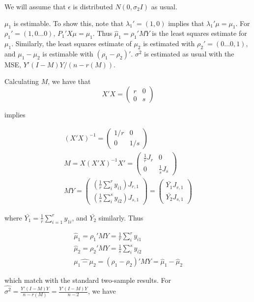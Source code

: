 \documentclass{article}
\begin{document}
We will assume that $\epsilon$ is distributed $N(0, \sigma_2I)$ as usual.

$\mu_1$ is estimable. To show this, note that $\lambda_1' = (1, 0)$ implies that $\lambda_1' \mu = \mu_1$. For $\rho_1' = (1, 0 \dots 0)$, $P_1'X\mu = \mu_1$. Thus $\hat{\mu}_1 = \rho_1'MY$ is the least squares estimate for $\mu_1$. Similarly, the least squares estimate of $\mu_2$ is estimated with $\rho_2' = (0 \dots 0, 1)$, and $\mu_1 - \mu_2$ is estimable with $(\rho_1 - \rho_2)'$. $\sigma^2$ is estimated as usual with the MSE, $Y'(I-M)Y/(n-r(M))$.

Calculating $M$, we have that
\[
X'X = \begin{pmatrix}
r & 0 \\
0 & s \end{pmatrix}
\]

implies

\begin{gather*}
(X'X)^{-1} = \begin{pmatrix}
1/r & 0 \\
0 & 1/s \end{pmatrix} \\
M = X(X'X)^{-1}X' = \begin{pmatrix}
\frac{1}{r} J_{r} & 0 \\
0 & \frac{1}{s} J_{s}
\end{pmatrix} \\
MY = \begin{pmatrix}
\left(\frac{1}{r}\sum_i^r y_{i1}\right)J_{r,1} \\
\left(\frac{1}{s}\sum_i^s y_{i2}\right)J_{s,1}
\end{pmatrix} = 
\begin{pmatrix}
\bar{Y_1}J_{r,1} \\
\bar{Y_2}J_{s,1}
\end{pmatrix}
\end{gather*}

where $\bar{Y_1} = \frac{1}{r}\sum_{i=1}^r y_{1i}$, and $\bar{Y_2}$ similarly. Thus

\begin{gather}
\hat{\mu}_1 = \rho_1'MY = \frac{1}{r}\sum_i^r y_{i1} \\
\hat{\mu}_2 = \rho_2'MY = \frac{1}{s}\sum_i^s y_{i2} \\
\widehat{\mu_1-\mu_2} = (\rho_1-\rho_2)'MY = \hat{\mu}_1 - \hat{\mu}_2
\end{gather}

which match with the standard two-sample results. For $\hat{\sigma^2} = \frac{Y'(I-M)Y}{n-r(M)} = \frac{Y'(I-M)Y}{n-2}$, we have
\end{document}
